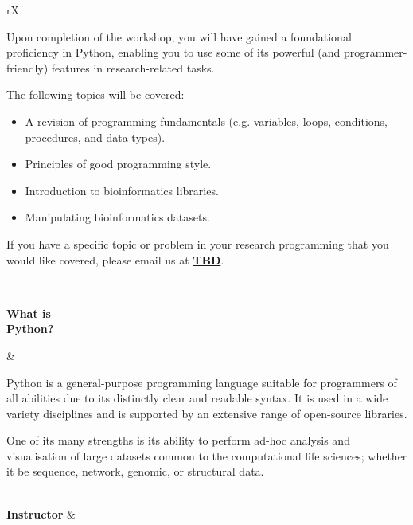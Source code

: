 \documentclass[10pt]{article}
\begin{document}
\begin{minipage}[t]{\linewidth}
\begin{tabu}{rX}
\begin{varwidth}[t]{\linewidth}
                \medskip
                Upon completion of the workshop, you will have gained a
                foundational proficiency in Python, enabling you to use
                some of its powerful (and programmer-friendly) features
                in research-related tasks.\par
                \medskip
                The following topics will be covered:
                \begin{itemize}
                    \item[] A revision of programming fundamentals (e.g.
                        variables, loops, conditions, procedures, and data
                        types).
                    \item[]
                        Principles of good programming style.
                    \item[]
                        Introduction to bioinformatics libraries.
                    \item[]
                        Manipulating bioinformatics datasets.
                \end{itemize}
                If you have a specific topic or problem in your research
                programming that you would like covered, please email us at
                \href{TBD}{\bfseries TBD}.
                \end{varwidth} \\
       \begin{varwidth}[t]{\linewidth}
           \textbf{What is\\ Python?}
       \end{varwidth} &
                \begin{varwidth}[t]{\linewidth}
                    \raggedright
                Python is a general-purpose programming language suitable for
                programmers of all abilities due to its distinctly clear and
                readable syntax. It is used in a wide variety disciplines and is
                supported by an extensive range of open-source libraries.\par
                \medskip
                One of its many strengths is its ability to perform ad-hoc
                analysis and visualisation of large datasets common to the
                computational life sciences; whether it be sequence, network,
                genomic, or structural data.
                               \end{varwidth} \\
        \textbf{Instructor} & \begin{varwidth}[t]{\linewidth}

\end{varwidth}
\end{tabu}
\end{minipage}
\end{document}
